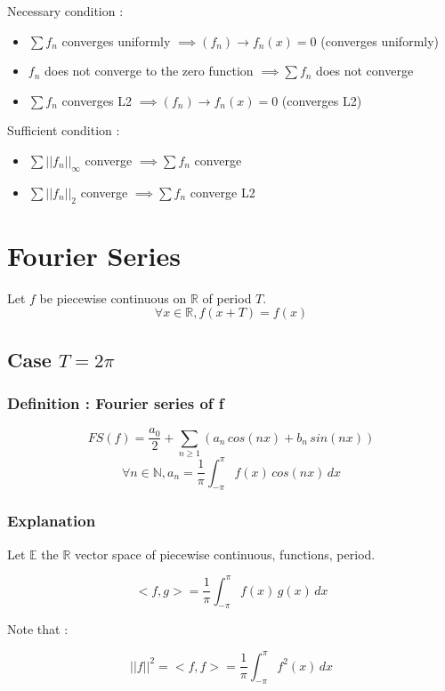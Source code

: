 \documentclass[a4paper,12pt]{article}
\begin{document}
Necessary condition : 
\begin{itemize}
    \item $\sum f_n$ converges uniformly $\implies (f_n) \rightarrow f_n(x) = 0$ (converges uniformly)
    \item $f_n$ does not converge to the zero function $\implies \sum{f_n}$ does not converge
    \item $\sum f_n$ converges L2 $\implies (f_n) \rightarrow f_n(x) = 0$ (converges L2)
\end{itemize}

Sufficient condition :
\begin{itemize}
    \item $\sum{||f_n||_\infty}$ converge $\implies \sum{f_n}$ converge
    \item $\sum{||f_n||_2}$ converge $\implies \sum{f_n}$ converge L2
\end{itemize}

\section{Fourier Series}

Let $f$ be piecewise continuous on $\mathbb{R}$ of period $T$.
\[
\forall x \in \mathbb{R}, f(x + T) = f(x)
\]

\subsection{Case $T = 2\pi$}

\subsubsection{Definition : Fourier series of f}

\[
FS(f) = \frac{a_0}{2} + \sum_{n\geq 1}{(a_n \, cos(nx) + b_n \,sin(nx))}
\]
\[
\forall n \in \mathbb{N}, a_n = \frac{1}{\pi} \int_{-\pi}^{\pi}{f(x) \, cos(nx) \, dx}
\]

\subsubsection{Explanation}

Let $\mathbb{E}$ the $\mathbb{R}$ vector space of piecewise continuous, functions, period. 

\[
<f, g> = \frac{1}{\pi}\int_{-\pi}^{\pi}{f(x)\,g(x)\,dx}
\]

Note that :

\[
||f||^2 = <f, f> = \frac{1}{\pi}\int_{-\pi}^{\pi}{f^2(x)\,dx}
\]
\end{document}
